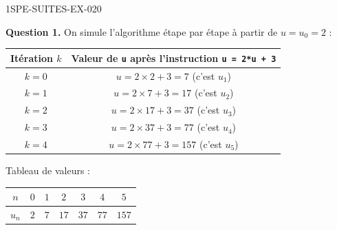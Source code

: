 \begin{corrige}{1SPE-SUITES-EX-020}


\textbf{Question 1.} On simule l'algorithme étape par étape à partir de $u = u_0 = 2$ :

\medskip
\begin{center}
\begin{tabular}{|c|c|}
\hline
Itération $k$ & Valeur de \texttt{u} après l'instruction \texttt{u = 2*u + 3} \\
\hline
$k = 0$ & $u = 2 \times 2 + 3 = 7$ (c'est $u_1$) \\
\hline
$k = 1$ & $u = 2 \times 7 + 3 = 17$ (c'est $u_2$) \\
\hline
$k = 2$ & $u = 2 \times 17 + 3 = 37$ (c'est $u_3$) \\
\hline
$k = 3$ & $u = 2 \times 37 + 3 = 77$ (c'est $u_4$) \\
\hline
$k = 4$ & $u = 2 \times 77 + 3 = 157$ (c'est $u_5$) \\
\hline
\end{tabular}
\end{center}
\medskip

Tableau de valeurs :

\medskip
\begin{tabular}{|c|c|c|c|c|c|c|}
\hline
$n$ & $0$ & $1$ & $2$ & $3$ & $4$ & $5$ \\
\hline
$u_n$ & $2$ & $7$ & $17$ & $37$ & $77$ & $157$ \\
\hline
\end{tabular}
\medskip



\end{corrige}
